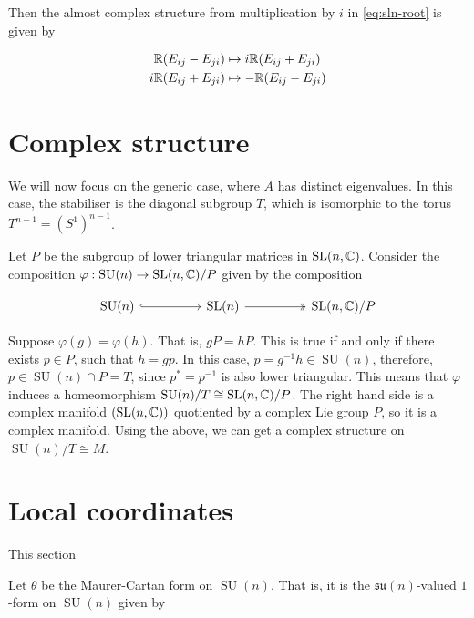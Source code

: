 \documentclass{article}
\DeclareMathOperator{\SU}{SU}
\newcommand{\su}{\mathfrak{su}}
\begin{document}
Then the almost complex structure from multiplication by \(i\) in \cref{eq:sln-root} is given by

\begin{align*}
    \mathbb{R}(E_{ij} - E_{ji}) &\mapsto i\mathbb{R}(E_{ij} + E_{ji}) \\
    i\mathbb{R}(E_{ij} + E_{ji}) &\mapsto -\mathbb{R}(E_{ij} - E_{ji})
\end{align*}

\section{Complex structure}

We will now focus on the generic case, where \(A\) has distinct eigenvalues. In this case, the stabiliser is the diagonal subgroup \(T\), which is isomorphic to the torus \(T^{n-1} = (S^1)^{n-1}\).

Let \(P\) be the subgroup of lower triangular matrices in \(\operatorname{SL}(n, \mathbb{C})\). Consider the composition \(\varphi : \SU(n) \to \SL(n, \C)/P\) given by the composition 

\[\begin{tikzcd}
	{\SU(n)} && {\SL(n)} && {\SL(n, \C)/P}
	\arrow[hook, from=1-1, to=1-3]
	\arrow[two heads, from=1-3, to=1-5]
\end{tikzcd}\]

Suppose \(\varphi(g) = \varphi(h)\). That is, \(gP = hP\). This is true if and only if there exists \(p \in P\), such that \(h = gp\). In this case, \(p = g^{-1}h \in \SU(n)\), therefore, \(p \in \SU(n) \cap P = T\), since \(p^* = p^{-1}\) is also lower triangular. This means that \(\varphi\) induces a homeomorphism \(\SU(n)/T \cong \SL(n, \C)/P\). The right hand side is a complex manifold \((\operatorname{SL}(n, \mathbb{C}))\) quotiented by a complex Lie group \(P\), so it is a complex manifold. Using the above, we can get a complex structure on \(\SU(n)/T \cong  M\).

\section{Local coordinates}

This section

Let \(\theta\) be the Maurer-Cartan form on \(\SU(n)\). That is, it is the \(\su(n)\)-valued \(1\)-form on \(\SU(n)\) given by
\end{document}
